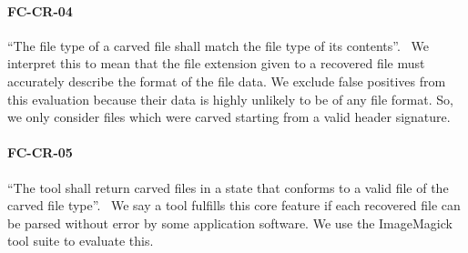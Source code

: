  \paragraph{FC-CR-04} ``The file type of a carved file shall match the file type of its contents''.~\cite{carving_standards}
 We interpret this to mean that the file extension given to a recovered file must accurately describe the format of the file data. We exclude false positives from this evaluation because their data is highly unlikely to be of any file format. So, we only consider files which were carved starting from a valid header signature.
 
 \paragraph{FC-CR-05} ``The tool shall return carved files in a state that conforms to a valid file of the carved file type''.~\cite{carving_standards}
 We say a tool fulfills this core feature if each recovered file can be parsed without error by some application software.
 We use the ImageMagick tool suite to evaluate this.
